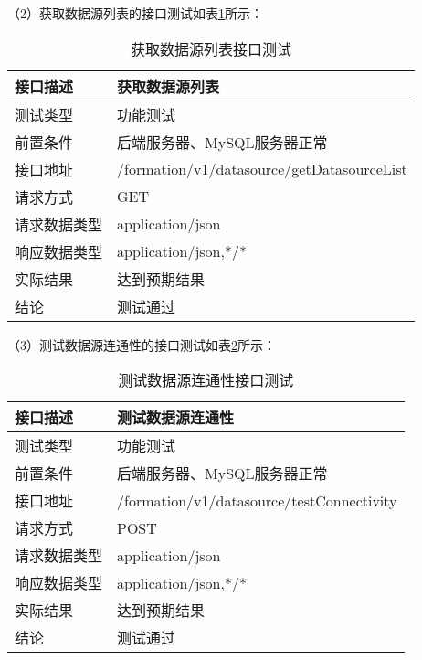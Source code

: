 （2）获取数据源列表的接口测试如表\ref{tab:exampletable2}所示：

\begin{table}[H]
  \centering
  \caption{获取数据源列表接口测试}
  \label{tab:exampletable2}
  \begin{tabular}{ll}
    \toprule
    接口描述         & 获取数据源列表         \\
    \midrule
    测试类型         & 功能测试         \\
    前置条件         & 后端服务器、MySQL服务器正常         \\
    接口地址       & /formation/v1/datasource/getDatasourceList         \\
    请求方式         & GET      \\
    请求数据类型         & application/json     \\
    响应数据类型         & application/json,*/*           \\
    实际结果         & 达到预期结果           \\
    结论            & 测试通过           \\
    \bottomrule
  \end{tabular}
\end{table}

（3）测试数据源连通性的接口测试如表\ref{tab:exampletable3}所示：

\begin{table}[H]
  \centering
  \caption{测试数据源连通性接口测试}
  \label{tab:exampletable3}
  \begin{tabular}{ll}
    \toprule
    接口描述         & 测试数据源连通性         \\
    \midrule
    测试类型         & 功能测试         \\
    前置条件         & 后端服务器、MySQL服务器正常         \\
    接口地址       & /formation/v1/datasource/testConnectivity         \\
    请求方式         & POST      \\
    请求数据类型         & application/json     \\
    响应数据类型         & application/json,*/*           \\
    实际结果         & 达到预期结果           \\
    结论            & 测试通过           \\
    \bottomrule
  \end{tabular}
\end{table}

